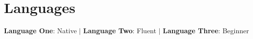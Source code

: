 
\section{Languages}
\begin{itemize}[leftmargin=0.15in, label={}]
  \small{\item{
        \textbf{Language One}{: Native} $|$
        \textbf{Language Two}{: Fluent} $|$
        \textbf{Language Three}{: Beginner}
        }}
\end{itemize}
